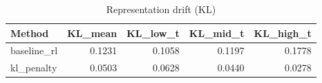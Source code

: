 \begin{table}[htbp]
\centering
\caption{Representation drift (KL)}
\label{tab:repr-drift}
\begin{tabular}{lrrrr}
\toprule
\textbf{Method} & \textbf{KL\_mean} & \textbf{KL\_low\_t} & \textbf{KL\_mid\_t} & \textbf{KL\_high\_t} \\
\midrule
baseline\_rl & 0.1231 & 0.1058 & 0.1197 & 0.1778 \\
kl\_penalty & 0.0503 & 0.0628 & 0.0440 & 0.0278 \\
\bottomrule
\end{tabular}
\end{table}